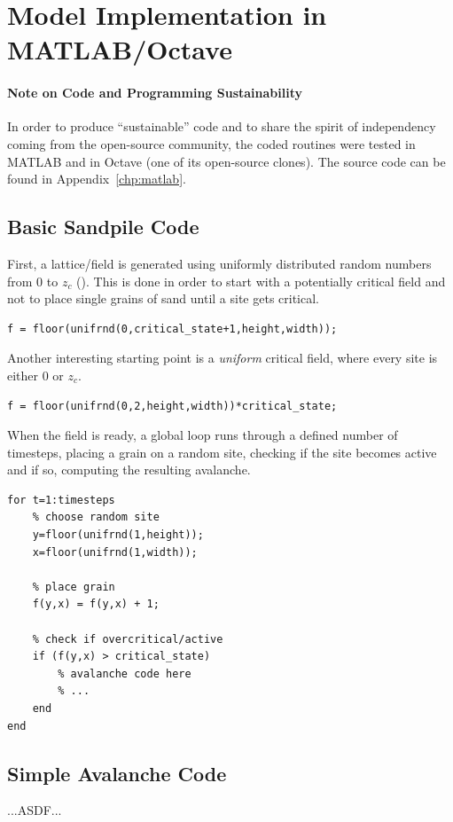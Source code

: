 \chapter{Model Implementation in MATLAB/Octave}
\thispagestyle{fancy}

\subsubsection{Note on Code and Programming Sustainability}
In order to produce  ``sustainable'' code and to share the spirit of independency coming from the open-source community, the coded routines were tested in MATLAB and in Octave (one of its open-source clones). The source code can be found in Appendix~\ref{chp:matlab}.

\section{Basic Sandpile Code}
First, a lattice/field is generated using uniformly distributed random numbers from 0 to $z_c$ (). This is done in order to start with a potentially critical field and not to place single grains of sand until a site gets critical.
\begin{lstlisting}
f = floor(unifrnd(0,critical_state+1,height,width));
\end{lstlisting}
Another interesting starting point is a \emph{uniform} critical field, where every site is either 0 or $z_c$.
\begin{lstlisting}
f = floor(unifrnd(0,2,height,width))*critical_state;
\end{lstlisting}

When the field is ready, a global loop runs through a defined number of timesteps, placing a grain on a random site, checking if the site becomes active and if so, computing the resulting avalanche.
\begin{lstlisting}
for t=1:timesteps
	% choose random site
	y=floor(unifrnd(1,height));
	x=floor(unifrnd(1,width));

	% place grain
	f(y,x) = f(y,x) + 1;

	% check if overcritical/active
	if (f(y,x) > critical_state)
		% avalanche code here
		% ...
	end
end
\end{lstlisting}

\section{Simple Avalanche Code}
...ASDF...

